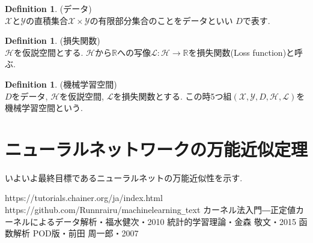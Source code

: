 \documentclass[11pt, a4paper, dvipdfmx]{jsarticle}
\theoremstyle{definition}
\newtheorem{Definition+}[Axiom+]{Definition}
\newcommand{\R}{\mathbb{R}}
\newcommand{\X}{\mathcal{X}}
\newcommand{\Y}{\mathcal{Y}}
\renewcommand{\L}{\mathcal{L}}
\newcommand{\Hil}{\mathcal{H}}
\newcommand{\MLsp}{(\X, \Y, D, \Hil, \L)}
\begin{document}
\begin{Definition+}(データ)\\
    $\X$と$\Y$の直積集合$\X\times\Y$の有限部分集合のことをデータといい
    $D$で表す.
\end{Definition+}

\begin{Definition+}(損失関数)\\
    $\Hil$を仮説空間とする. $\Hil$から$\R$への写像$\L:\Hil\to\R$を損失関数(Loss function)と呼ぶ.
\end{Definition+}
\begin{Definition+}(機械学習空間)\\
    $D$をデータ, $\Hil$を仮説空間, $\L$を損失関数とする. この時5つ組$\MLsp$を機械学習空間という.
\end{Definition+}
\section{ニューラルネットワークの万能近似定理}
いよいよ最終目標であるニューラルネットの万能近似性を示す.





\begin{thebibliography}{9}
     https://tutorials.chainer.org/ja/index.html
     https://github.com/Runnrairu/machinelearning\verb|_|text
     カーネル法入門―正定値カーネルによるデータ解析・福水健次・2010
     統計的学習理論・金森 敬文・2015
     函数解析 POD版・前田 周一郎・2007
\end{thebibliography}
\end{document}
